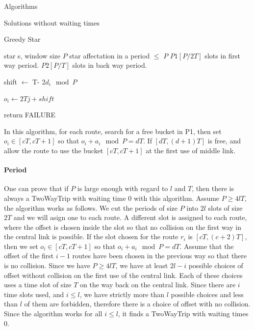 \documentclass[a4paper,10pt]{report}
\begin{document}
\begin{chapter}{Algorithms}
\begin{section}{Solutions without waiting times}
\begin{subsection}{Greedy Star}
 

\begin{algorithm}[H]
\caption{Greedy star assignment algorithm}
\begin{algorithmic}
\REQUIRE star s, window size $P$
\ENSURE star affectation in a period $\leq $ $P$ 
\STATE $P1[P/2T]$ slots in first way period.
\STATE $P2[P/T]$ slots in back way period.



\STATE shift $\leftarrow$ T- 2$d_i \mod P$ 


\STATE $o_i \leftarrow 2Tj + shift$
\ENDIF

\ENDIF

\STATE return FAILURE
\ENDIF
\ENDFOR

\ENDFOR

\end{algorithmic}
\end{algorithm}




In this algorithm, for each route, search for a free bucket in P1, then set $o_i \in [cT,cT+1]$ so that $o_i + a_i \mod P = dT$.
If $[dT,(d+1)T]$ is free, and allow the route to use the bucket $[cT,cT+1]$ at the first use of middle link.\\


\paragraph{Period}
One can prove that if $P$ is large enough with regard to $l$ and $T$, then there is always a TwoWayTrip
with waiting time $0$ with this algorithm.
 Assume $P \geq 4lT$, the algorithm works as follows. 
We cut the periods of size $P$ into $2l$ slots of size $2T$ and we will asign one to each route.
A different slot is assigned to each route, where the offset is chosen inside the slot so that 
no collision on the first way in the central link is possible. If the slot chosen for the route $r_i$ is $[cT,(c+2)T]$,
then we set $o_i \in [cT,cT+1]$ so that $o_i + a_i \mod P = dT$. Assume that the offset of the first $i-1$ routes have been 
chosen in the previous way so that there is no collision. Since we have $P \geq 4lT$, we have at least $2l-i$ possible choices of offset without collision on the first use of the central link. Each of these choices uses a time slot of size $T$ on the way back on the central link. Since there are $i$ time slots used, and $i \leq l$, we have strictly more than $l$ possible choices and less than $l$ of them are forbidden, therefore there is a choice of offset with no collision. 
Since the algorithm works for all $i \leq l$, it finds a TwoWayTrip with waiting times $0$. 


\end{subsection}
\end{section}
\end{chapter}
\end{document}

